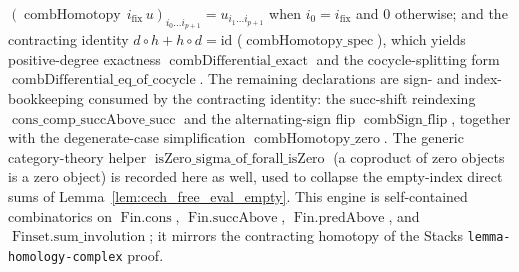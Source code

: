 \begin{lemma}
  \((\operatorname{combHomotopy}\, i_{\mathrm{fix}}\, u)_{i_0 \ldots i_{p+1}}
  = u_{i_1 \ldots i_{p+1}}\) when \(i_0 = i_{\mathrm{fix}}\) and \(0\) otherwise; and
  the contracting identity \(d \circ h + h \circ d = \mathrm{id}\)
  (\(\operatorname{combHomotopy\_spec}\)), which yields positive-degree exactness
  \(\operatorname{combDifferential\_exact}\) and the cocycle-splitting form
  \(\operatorname{combDifferential\_eq\_of\_cocycle}\). The remaining declarations are
  sign- and index-bookkeeping consumed by the contracting identity: the
  succ-shift reindexing \(\operatorname{cons\_comp\_succAbove\_succ}\) and the
  alternating-sign flip \(\operatorname{combSign\_flip}\), together with the
  degenerate-case simplification \(\operatorname{combHomotopy\_zero}\). The generic
  category-theory helper \(\operatorname{isZero\_sigma\_of\_forall\_isZero}\) (a
  coproduct of zero objects is a zero object) is recorded here as well, used to collapse
  the empty-index direct sums of Lemma~\ref{lem:cech_free_eval_empty}. This engine is
  self-contained combinatorics on \(\operatorname{Fin.cons}\),
  \(\operatorname{Fin.succAbove}\), \(\operatorname{Fin.predAbove}\), and
  \(\operatorname{Finset.sum\_involution}\); it mirrors the contracting homotopy of the
  Stacks \texttt{lemma-homology-complex} proof.
\end{lemma}

